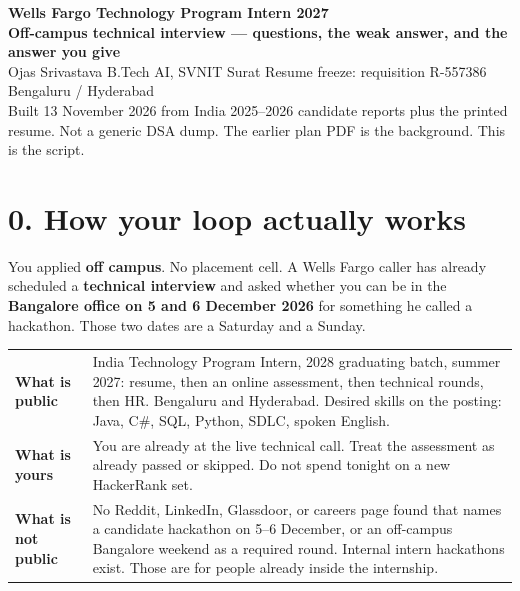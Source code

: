 \documentclass[a4paper,9.5pt]{extarticle}
\begin{document}
\begin{center}
  {\LARGE\textbf{Wells Fargo Technology Program Intern 2027}}\\[2pt]
  {\small\color{hot}\textbf{Off-campus technical interview --- questions, the weak answer, and the answer you give}}\\[3pt]
  {\small Ojas Srivastava \textbar{} B.Tech AI, SVNIT Surat \textbar{} Resume freeze: requisition R-557386 \textbar{} Bengaluru / Hyderabad}\\[1pt]
  {\footnotesize\color{muted} Built 13 November 2026 from India 2025--2026 candidate reports plus the printed resume. Not a generic DSA dump. The earlier plan PDF is the background. This is the script.}
\end{center}

\section{0. How your loop actually works}
You applied \textbf{off campus}. No placement cell. A Wells Fargo caller has already scheduled a \textbf{technical interview} and asked whether you can be in the \textbf{Bangalore office on 5 and 6 December 2026} for something he called a hackathon. Those two dates are a Saturday and a Sunday.

\noindent\begin{tabularx}{\textwidth}{@{}>{\bfseries}p{3.3cm} X@{}}
What is public & India Technology Program Intern, 2028 graduating batch, summer 2027: resume, then an online assessment, then technical rounds, then HR. Bengaluru and Hyderabad. Desired skills on the posting: Java, C\#, SQL, Python, SDLC, spoken English. \\
What is yours & You are already at the live technical call. Treat the assessment as already passed or skipped. Do not spend tonight on a new HackerRank set. \\
What is not public & No Reddit, LinkedIn, Glassdoor, or careers page found that names a candidate hackathon on 5--6 December, or an off-campus Bangalore weekend as a required round. Internal intern hackathons exist. Those are for people already inside the internship. \\
\end{tabularx}
\end{document}
